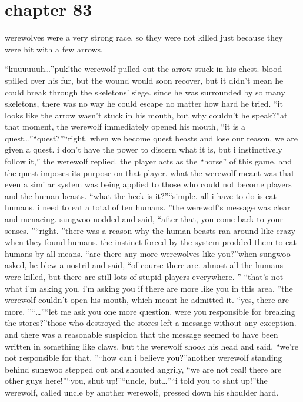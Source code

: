 \section{chapter 83}

                            werewolves were a very strong race, so they were not killed just because they were hit with a few arrows.





“kuuuuuuh…”puk!the werewolf pulled out the arrow stuck in his chest.
 blood spilled over his fur, but the wound would soon recover, but it didn’t mean he could break through the skeletons’ siege.
 since he was surrounded by so many skeletons, there was no way he could escape no matter how hard he tried.
“it looks like the arrow wasn’t stuck in his mouth, but why couldn’t he speak?”at that moment, the werewolf immediately opened his mouth, “it is a quest…”“quest?”“right.
 when we become quest beasts and lose our reason, we are given a quest.
 i don’t have the power to discern what it is, but i instinctively follow it,” the werewolf replied.
the player acts as the “horse” of this game, and the quest imposes its purpose on that player.
what the werewolf meant was that even a similar system was being applied to those who could not become players and the human beasts.
“what the heck is it?”“simple.
 all i have to do is eat humans.
 i need to eat a total of ten humans.
”the werewolf’s message was clear and menacing.
sungwoo nodded and said, “after that, you come back to your senses.
”“right.
”there was a reason why the human beasts ran around like crazy when they found humans.
 the instinct forced by the system prodded them to eat humans by all means.
“are there any more werewolves like you?”when sungwoo asked, he blew a nostril and said, “of course there are.
 almost all the humans were killed, but there are still lots of stupid players everywhere.
”
“that’s not what i’m asking you.
 i’m asking you if there are more like you in this area.
”the werewolf couldn’t open his mouth, which meant he admitted it.
“yes, there are more.
”“…”“let me ask you one more question.
 were you responsible for breaking the stores?”those who destroyed the stores left a message without any exception.
 and there was a reasonable suspicion that the message seemed to have been written in something like claws.
but the werewolf shook his head and said, “we’re not responsible for that.
”“how can i believe you?”another werewolf standing behind sungwoo stepped out and shouted angrily, “we are not real! there are other guys here!”“you, shut up!”“uncle, but…”“i told you to shut up!”the werewolf, called uncle by another werewolf, pressed down his shoulder hard.
